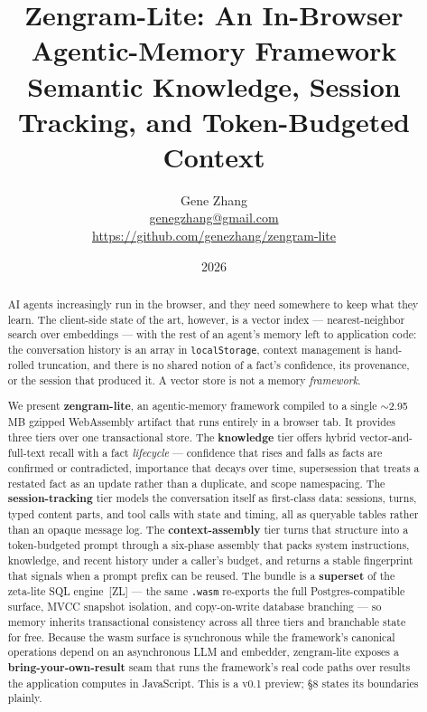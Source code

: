 \documentclass[11pt]{article}
\title{\textbf{Zengram-Lite: An In-Browser Agentic-Memory Framework}\\[0.3em]
\large Semantic Knowledge, Session Tracking, and Token-Budgeted Context}
\author{Gene Zhang\\[0.2em]
\normalsize\href{mailto:genegzhang@gmail.com}{genegzhang@gmail.com}\\[0.2em]
\normalsize\url{https://github.com/genezhang/zengram-lite}}
\date{2026}
\newcommand{\code}[1]{\texttt{#1}}
\begin{document}
\maketitle

\begin{abstract}
AI agents increasingly run in the browser, and they need somewhere to keep what
they learn. The client-side state of the art, however, is a vector index ---
nearest-neighbor search over embeddings --- with the rest of an agent's memory
left to application code: the conversation history is an array in
\code{localStorage}, context management is hand-rolled truncation, and there is
no shared notion of a fact's confidence, its provenance, or the session that
produced it. A vector store is not a memory \emph{framework}.

We present \textbf{zengram-lite}, an agentic-memory framework compiled to a
single $\sim$2.95\,MB gzipped WebAssembly artifact that runs entirely in a
browser tab. It provides three tiers over one transactional store. The
\textbf{knowledge} tier offers hybrid vector-and-full-text recall with a fact
\emph{lifecycle} --- confidence that rises and falls as facts are confirmed or
contradicted, importance that decays over time, supersession that treats a
restated fact as an update rather than a duplicate, and scope namespacing. The
\textbf{session-tracking} tier models the conversation itself as first-class
data: sessions, turns, typed content parts, and tool calls with state and
timing, all as queryable tables rather than an opaque message log. The
\textbf{context-assembly} tier turns that structure into a token-budgeted prompt
through a six-phase assembly that packs system instructions, knowledge, and
recent history under a caller's budget, and returns a stable fingerprint that
signals when a prompt prefix can be reused. The bundle is a \textbf{superset} of
the zeta-lite SQL engine~[ZL] --- the same \code{.wasm} re-exports the full
Postgres-compatible surface, MVCC snapshot isolation, and copy-on-write database
branching --- so memory inherits transactional consistency across all three
tiers and branchable state for free. Because the wasm surface is synchronous
while the framework's canonical operations depend on an asynchronous LLM and
embedder, zengram-lite exposes a \textbf{bring-your-own-result} seam that runs
the framework's real code paths over results the application computes in
JavaScript. This is a v0.1 preview; \S8 states its boundaries plainly.
\end{abstract}
\end{document}
